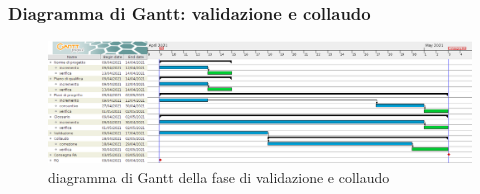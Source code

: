 	\subsubsection{Diagramma di Gantt: validazione e collaudo}

	\begin{figure}[H]
		\centering
		\includegraphics[width=1\linewidth]{./res/images/Validazione.png}
		\caption{diagramma di Gantt della fase di validazione e collaudo}
		\label{fig:diagramma di Gantt della fase di validazione e collaudo}
	\end{figure}
	
	